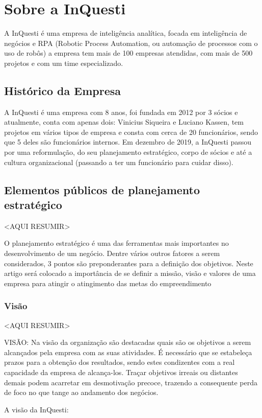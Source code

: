 \chapter{Sobre a InQuesti}
A InQuesti é uma empresa de inteligência analítica, focada em inteligência de negócios e RPA (Robotic Process Automation, ou automação de processos com o uso de robôs) a empresa tem mais de 100 empresas atendidas, com mais de 500 projetos e com um time especializado. 

\section{Histórico da Empresa}
A InQuesti é uma empresa com 8 anos, foi fundada em 2012 por 3 sócios e atualmente, conta com apenas dois: Vinicius Siqueira e Luciano Kassen, tem projetos em vários tipos de empresa e consta com cerca de 20 funcionários, sendo que 5 deles são funcionários internos. 
Em dezembro de 2019, a InQuesti passou por uma reformulação, do seu planejamento estratégico, corpo de sócios e até a cultura organizacional (passando a ter um funcionário para cuidar disso).

\section{Elementos públicos de planejamento estratégico}
<AQUI RESUMIR>

O planejamento estratégico é uma das ferramentas mais importantes no desenvolvimento de um negócio. Dentre vários outros fatores a serem considerados, 3 pontos são preponderantes para a definição dos objetivos. Neste artigo será colocado a importância de se definir a missão, visão e valores de uma empresa para atingir o atingimento das metas do empreendimento

\subsection{Visão}
<AQUI RESUMIR>

VISÃO: Na visão da organização são destacadas quais são os objetivos a serem alcançados pela empresa com as suas atividades. É necessário que se estabeleça prazos para a obtenção dos resultados, sendo estes condizentes com a real capacidade da empresa de alcança-los. Traçar objetivos irreais ou distantes demais podem acarretar em desmotivação precoce, trazendo a consequente perda de foco no que tange ao andamento dos negócios.

A visão da InQuesti:

